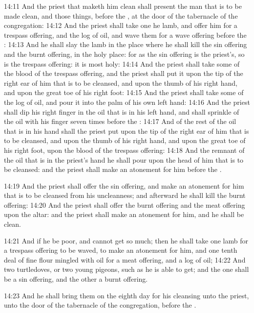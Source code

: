 14:11 And the priest that maketh him clean shall present the man that is to be made clean, and those things, before the \LORD, at the door of the tabernacle of the congregation: 14:12 And the priest shall take one he lamb, and offer him for a trespass offering, and the log of oil, and wave them for a wave offering before the \LORD: 14:13 And he shall slay the lamb in the place where he shall kill the sin offering and the burnt offering, in the holy place: for as the sin offering is the priest's, so is the trespass offering: it is most holy: 14:14 And the priest shall take some of the blood of the trespass offering, and the priest shall put it upon the tip of the right ear of him that is to be cleansed, and upon the thumb of his right hand, and upon the great toe of his right foot: 14:15 And the priest shall take some of the log of oil, and pour it into the palm of his own left hand: 14:16 And the priest shall dip his right finger in the oil that is in his left hand, and shall sprinkle of the oil with his finger seven times before the \LORD: 14:17 And of the rest of the oil that is in his hand shall the priest put upon the tip of the right ear of him that is to be cleansed, and upon the thumb of his right hand, and upon the great toe of his right foot, upon the blood of the trespass offering: 14:18 And the remnant of the oil that is in the priest's hand he shall pour upon the head of him that is to be cleansed: and the priest shall make an atonement for him before the \LORD.

14:19 And the priest shall offer the sin offering, and make an atonement for him that is to be cleansed from his uncleanness; and afterward he shall kill the burnt offering: 14:20 And the priest shall offer the burnt offering and the meat offering upon the altar: and the priest shall make an atonement for him, and he shall be clean.

14:21 And if he be poor, and cannot get so much; then he shall take one lamb for a trespass offering to be waved, to make an atonement for him, and one tenth deal of fine flour mingled with oil for a meat offering, and a log of oil; 14:22 And two turtledoves, or two young pigeons, such as he is able to get; and the one shall be a sin offering, and the other a burnt offering.

14:23 And he shall bring them on the eighth day for his cleansing unto the priest, unto the door of the tabernacle of the congregation, before the \LORD.

